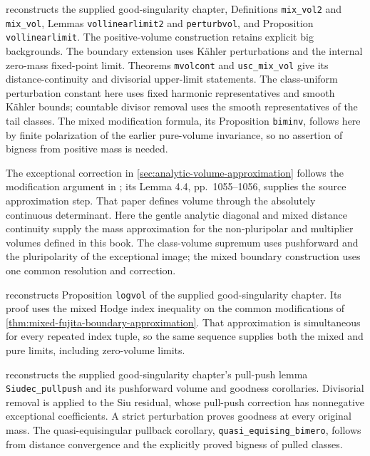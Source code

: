  reconstructs the supplied good-singularity chapter, Definitions \texttt{mix\_vol2} and \texttt{mix\_vol}, Lemmas \texttt{vollinearlimit2} and \texttt{perturbvol}, and Proposition \texttt{vollinearlimit}. The positive-volume construction retains explicit big backgrounds. The boundary extension uses K\"ahler perturbations and the internal zero-mass fixed-point limit. Theorems \texttt{mvolcont} and \texttt{usc\_mix\_vol} give its distance-continuity and divisorial upper-limit statements. The class-uniform perturbation constant here uses fixed harmonic representatives and smooth K\"ahler bounds; countable divisor removal uses the smooth representatives of the tail classes. The mixed modification formula, its Proposition \texttt{biminv}, follows here by finite polarization of the earlier pure-volume invariance, so no assertion of bigness from positive mass is needed.

The exceptional correction in \cref{sec:analytic-volume-approximation} follows the modification argument in \cite[Theorem 1.4, proof p.~1056]{Bou02b}; its Lemma 4.4, pp.~1055--1056, supplies the source approximation step. That paper defines volume through the absolutely continuous determinant. Here the gentle analytic diagonal and mixed distance continuity supply the mass approximation for the non-pluripolar and multiplier volumes defined in this book. The class-volume supremum uses pushforward and the pluripolarity of the exceptional image; the mixed boundary construction uses one common resolution and correction.

 reconstructs Proposition \texttt{logvol} of the supplied good-singularity chapter. Its proof uses the mixed Hodge index inequality on the common modifications of \cref{thm:mixed-fujita-boundary-approximation}. That approximation is simultaneous for every repeated index tuple, so the same sequence supplies both the mixed and pure limits, including zero-volume limits.


 reconstructs the supplied good-singularity chapter's pull-push lemma \texttt{Siudec\_pullpush} and its pushforward volume and goodness corollaries. Divisorial removal is applied to the Siu residual, whose pull-push correction has nonnegative exceptional coefficients. A strict perturbation proves goodness at every original mass. The quasi-equisingular pullback corollary, \texttt{quasi\_equising\_bimero}, follows from distance convergence and the explicitly proved bigness of pulled classes.

